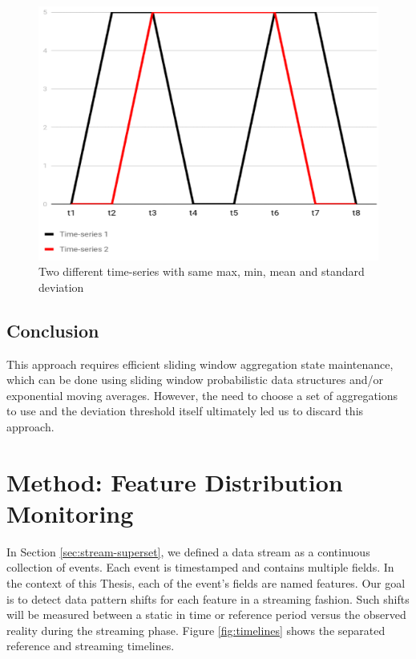 \begin{figure}[!htb]
    \begin{center}
      \includegraphics[scale=0.7]{figures/approach2-timeseries.png}
      \caption[]{Two different time-series with same max, min, mean and standard deviation}
      \label{fig:approach2-timeseries}
    \end{center}
\end{figure}

\subsection*{Conclusion}
This approach requires efficient sliding window aggregation state maintenance, which can be done using sliding window probabilistic data structures and/or exponential moving averages. However, the need to choose a set of aggregations to use and the deviation threshold itself ultimately led us to discard this approach.

\section{Method: Feature Distribution Monitoring} \label{sec:ft-monitoring}

In Section \ref{sec:stream-superset}, we defined a data stream as a continuous collection of events. Each event is timestamped and contains multiple fields. In the context of this Thesis, each of the event's fields are named features. Our goal is to detect data pattern shifts for each feature in a streaming fashion. Such shifts will be measured between a static in time or reference period versus the observed reality during the streaming phase. Figure \ref{fig:timelines} shows the separated reference and streaming timelines.

